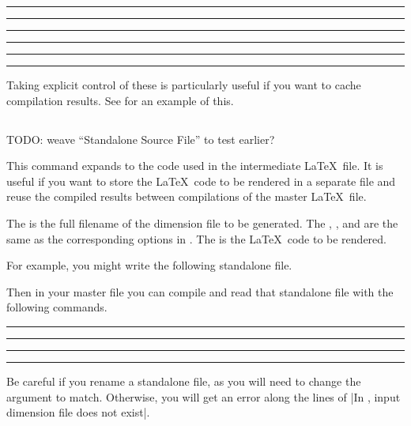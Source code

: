 \documentclass[10pt]{ltxdoc}
\newcommand{\showfile}[1]{
  \begin{tcolorbox}[title=\texttt{#1}]
  
  \end{tcolorbox}
}
\def\gauge{%
  \rule{0.2em}{7pt}%
  \llap{\rule[8pt]{0.2em}{2pt}}%
}
\begin{document}
\begin{tcblisting}{}
\gauge
{}%
\gauge

\gauge\ExternalCompile[file=example-external-separate]\gauge

\gauge\ExternalRead[file=example-external-separate]\gauge
\end{tcblisting}

Taking explicit control of these is particularly useful if you want to
cache compilation results.
See  for an example of this.

\subsection{}
\label{subsec:ExternalCode}


TODO: weave ``Standalone Source File'' to test earlier?

This command expands to the code used in the intermediate \LaTeX\ file.
It is useful if you want to store the \LaTeX\ code to be rendered in a
separate file and reuse the compiled results between compilations
of the master \LaTeX\ file.

The  is the full filename of the dimension file to
be generated.
The , , and  are the
same as the corresponding options in .
The  is the \LaTeX\ code to be rendered.

For example, you might write the following standalone file.

\showfile{example-standalone-simple.tex}

Then in your master file you can compile and read that standalone file
with the following commands.

\begin{tcblisting}{}
\gauge\ExternalCompile[file=example-standalone-simple]\gauge

\gauge\ExternalRead[file=example-standalone-simple]\gauge
\end{tcblisting}

Be careful if you rename a standalone file, as you will need to change
the  argument to match.
Otherwise, you will get an error along the lines of
|In \ExternalRead, input dimension file does not exist|.
\end{document}
